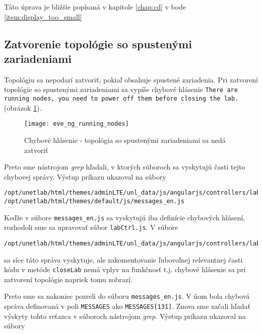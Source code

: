 Táto úprava je bližšie popísaná v kapitole \ref{chap:cd} v bode \ref{item:display_too_small}






\subsection{Zatvorenie topológie so spustenými zariadeniami}
\label{chap:zatvorenie_topo_so_spustenymi_zariadeniami}

Topológiu sa nepodarí zatvoriť, pokiaľ obsahuje spustené zariadenia. Pri zatvorení topológie so spustenými zariadeniami sa vypíše chybové hlásenie \texttt{There are running nodes, you need to power off them before closing the lab.} (obrázok \ref{obr:eve_ng_running_nodes}).

\begin{figure}
    \centering
    \texttt{[image: eve\_ng\_running\_nodes]}
    \caption{Chybové hlásenie - topológia so spustenými zariadeniami sa nedá zatvoriť}
    \label{obr:eve_ng_running_nodes}
\end{figure}

Preto sme nástrojom \emph{grep} hľadali, v ktorých súboroch sa vyskytujú časti tejto chybovej správy. Výstup príkazu ukazoval na súbory

\renewcommand\baselinestretch{1}
\begin{Verbatim}[samepage=true]
/opt/unetlab/html/themes/adminLTE/unl_data/js/angularjs/controllers/lab/labCtrl.js
/opt/unetlab/html/themes/default/js/messages_en.js
\end{Verbatim}
\renewcommand\baselinestretch{1.5}

Keďže v súbore \texttt{messages\_en.js} sa vyskytujú iba definície chybových hlásení, rozhodoli sme sa upravovať súbor \texttt{labCtrl.js}. V súbore

\renewcommand\baselinestretch{1}
\begin{Verbatim}[samepage=true]
/opt/unetlab/html/themes/adminLTE/unl_data/js/angularjs/controllers/lab/labCtrl.js
\end{Verbatim}
\renewcommand\baselinestretch{1.5}

sa síce táto správa vyskytuje, ale zakomentovanie ľubovoľnej relevantnej časti kódu v metóde \texttt{closeLab} nemá vplyv na funkčnosť t.j. chybové hlásenie sa pri zatvorení topológie napriek tomu zobrazí.

Preto sme sa nakoniec pozreli do súboru \texttt{messages\_en.js}. V ňom bola chybová správa definovaná v poli \texttt{MESSAGES} ako \texttt{MESSAGES[131]}. Znova sme začali hľadať výskyty tohto reťazca v súboroch nástrojom \emph{grep}. Výstup príkazu ukazoval na súbory

